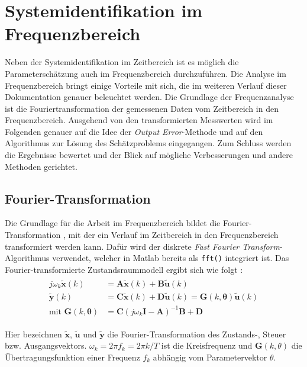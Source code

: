 \chapter{Systemidentifikation im Frequenzbereich}

Neben der Systemidentifikation im Zeitbereich ist es möglich die Parameterschätzung auch im Frequenzbereich durchzuführen. 
Die Analyse im Frequenzbereich bringt einige Vorteile mit sich, die im weiteren Verlauf dieser Dokumentation genauer 
beleuchtet werden. Die Grundlage der Frequenzanalyse ist die Fouriertransformation der gemessenen Daten vom Zeitbereich in 
den Frequenzbereich. Ausgehend von den transformierten Messwerten wird im Folgenden genauer auf die Idee der 
\textit{Output Error}-Methode und auf den Algorithmus zur Lösung des Schätzproblems eingegangen. Zum Schluss werden die 
Ergebnisse 
bewertet und der Blick auf mögliche Verbesserungen und andere Methoden gerichtet.


\section{Fourier-Transformation}  

Die Grundlage für die Arbeit im Frequenzbereich bildet die Fourier-Transformation \cite{Bendat1986}, mit der ein Verlauf im 
Zeitbereich in den Frequenzbereich transformiert werden kann. Dafür wird der diskrete \textit{Fast Fourier 
Transform}-Algorithmus verwendet, welcher in Matlab bereits als \texttt{fft()} integriert ist. Das Fourier-transformierte 
Zustandsraummodell ergibt sich wie folgt \cite{Klein2006}:
\begin{align}
	\begin{split}
		j\omega_{k}\mathbf{\tilde{x}}(k)  &= \mathbf{A\tilde{x}}(k) + \mathbf{B\tilde{u}}(k)  \\
		\mathbf{\tilde{y}}(k)             &= \mathbf{C\tilde{x}}(k) + \mathbf{D\tilde{u}}(k) = 
		\mathbf{G}(k,\mathbf{\theta})\mathbf{\tilde{u}}(k)  \\
		\text{mit }\mathbf{G}(k,\mathbf{\theta}) &= \mathbf{C}(j\omega_k\mathbf{I}-\mathbf{A})^{-1}\mathbf{B}+\mathbf{D}
		\label{eq:ZRD_Frequenzbereich}
	\end{split}
\end{align}

Hier bezeichnen $ \mathbf{\tilde{x}} $, $ \mathbf{\tilde{u}} $ und $ \mathbf{\tilde{y}} $ die Fourier-Transformation des 
Zustands-, Steuer bzw. Ausgangsvektors. $ \omega_k=2\pi f_k=2\pi k/T $ ist die Kreisfrequenz und $ \mathbf{G}(k,\theta) $ die 
Übertragungsfunktion einer Frequenz $ f_k $ abhängig vom Parametervektor $ \theta $.


